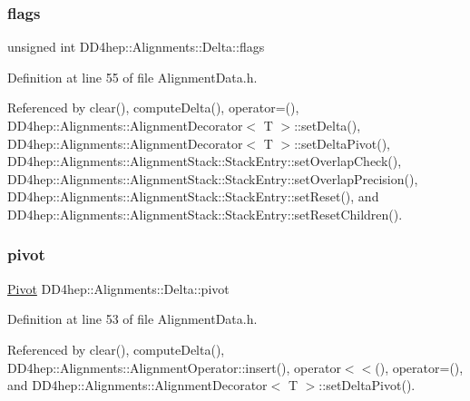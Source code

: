 \subsubsection{\texorpdfstring{flags}{flags}}
{\footnotesize\ttfamily unsigned int D\+D4hep\+::\+Alignments\+::\+Delta\+::flags}



Definition at line 55 of file Alignment\+Data.\+h.



Referenced by clear(), compute\+Delta(), operator=(), D\+D4hep\+::\+Alignments\+::\+Alignment\+Decorator$<$ T $>$\+::set\+Delta(), D\+D4hep\+::\+Alignments\+::\+Alignment\+Decorator$<$ T $>$\+::set\+Delta\+Pivot(), D\+D4hep\+::\+Alignments\+::\+Alignment\+Stack\+::\+Stack\+Entry\+::set\+Overlap\+Check(), D\+D4hep\+::\+Alignments\+::\+Alignment\+Stack\+::\+Stack\+Entry\+::set\+Overlap\+Precision(), D\+D4hep\+::\+Alignments\+::\+Alignment\+Stack\+::\+Stack\+Entry\+::set\+Reset(), and D\+D4hep\+::\+Alignments\+::\+Alignment\+Stack\+::\+Stack\+Entry\+::set\+Reset\+Children().

\hypertarget{class_d_d4hep_1_1_alignments_1_1_delta_acc2685bae6a2d77214b537136c31c653}{}\label{class_d_d4hep_1_1_alignments_1_1_delta_acc2685bae6a2d77214b537136c31c653} 
\subsubsection{\texorpdfstring{pivot}{pivot}}
{\footnotesize\ttfamily \hyperlink{class_d_d4hep_1_1_alignments_1_1_delta_a9ff8cc825f916a4ae84f1780c11f2519}{Pivot} D\+D4hep\+::\+Alignments\+::\+Delta\+::pivot}



Definition at line 53 of file Alignment\+Data.\+h.



Referenced by clear(), compute\+Delta(), D\+D4hep\+::\+Alignments\+::\+Alignment\+Operator\+::insert(), operator$<$$<$(), operator=(), and D\+D4hep\+::\+Alignments\+::\+Alignment\+Decorator$<$ T $>$\+::set\+Delta\+Pivot().

\hypertarget{class_d_d4hep_1_1_alignments_1_1_delta_ae901fae9cfcb9b8dd337943adeda4f0b}{}\label{class_d_d4hep_1_1_alignments_1_1_delta_ae901fae9cfcb9b8dd337943adeda4f0b} 
